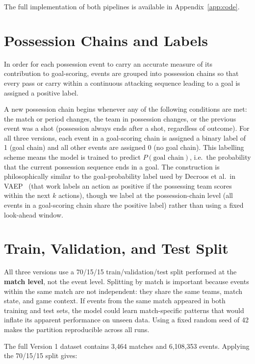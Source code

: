 The full implementation of both pipelines is available in Appendix~\ref{app:code}.

\section{Possession Chains and Labels}\label{sec:chains}

In order for each possession event to carry an accurate measure of its contribution to goal-scoring, events are grouped into possession chains so that every pass or carry within a continuous attacking sequence leading to a goal is assigned a positive label.

A new possession chain begins whenever any of the following conditions are met: the match or period changes, the team in possession changes, or the previous event was a shot (possession always ends after a shot, regardless of outcome). For all three versions, each event in a goal-scoring chain is assigned a binary label of 1 (goal chain) and all other events are assigned 0 (no goal chain). This labelling scheme means the model is trained to predict $P(\text{goal chain})$, i.e.\ the probability that the current possession sequence ends in a goal. The construction is philosophically similar to the goal-probability label used by Decroos et al.\ in VAEP~\cite{decroos2019} (that work labels an action as positive if the possessing team scores within the next $k$ actions), though we label at the possession-chain level (all events in a goal-scoring chain share the positive label) rather than using a fixed look-ahead window.

\section{Train, Validation, and Test Split}

All three versions use a 70/15/15 train/validation/test split performed at the \textbf{match level}, not the event level. Splitting by match is important because events within the same match are not independent: they share the same teams, match state, and game context. If events from the same match appeared in both training and test sets, the model could learn match-specific patterns that would inflate its apparent performance on unseen data. Using a fixed random seed of 42 makes the partition reproducible across all runs.

The full Version 1 dataset contains 3,464 matches and 6,108,353 events. Applying the 70/15/15 split gives:

